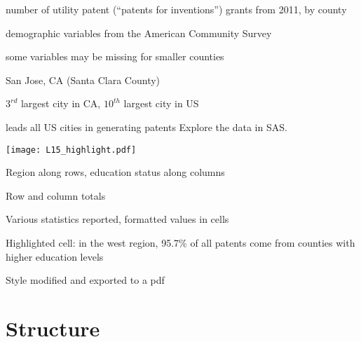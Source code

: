 \begin{frame}
\bi
\item number of utility patent (``patents for inventions'') grants from 2011, by county
\item demographic variables from the American Community Survey
\bi
\item some variables may be missing for smaller counties
\ei
\item San Jose, CA (Santa Clara County)
\bi
\item $3^{rd}$ largest city in CA, $10^{th}$ largest city in US
\item leads all US cities in generating patents
\ei
\ei
\oyo Explore the  data in SAS.
\end{frame}

\begin{frame}
\texttt{[image: L15\_highlight.pdf]}
\bi
\item Region along rows, education status along columns
\item Row and column totals
\item Various statistics reported, formatted values in cells
\item Highlighted cell: in the west region, 95.7\% of all patents come from counties with higher education levels
\item Style modified and exported to a pdf
\ei
\end{frame}

\section[Structure]{Structure}
\subsection{}
\begin{frame}
\end{frame}

